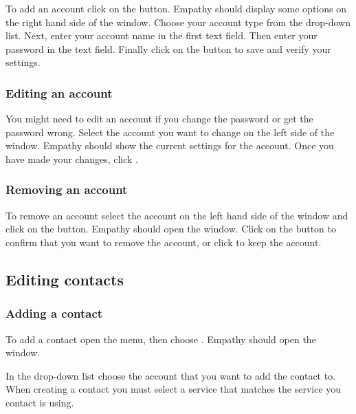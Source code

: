 To add an account click on the  button. Empathy should display 
some options on the right hand side of the window. Choose your account type 
from the  drop-down list. Next, enter your account name in 
the first text field. Then enter your password in the  
text field. Finally click on the  button to save and verify your 
settings.

\subsubsection{Editing an account}

You might need to edit an account if you change the password or get the password
wrong. Select the account you want to change on the left side of the 
 window. Empathy should show the current settings for the 
account. Once you have made your changes, click .

\subsubsection{Removing an account}

To remove an account select the account on the left hand side of the window and 
click on the  button. Empathy should open the 
 window. Click on the  button to 
confirm that you want to remove the account, or click  to keep
the account.

\subsection{Editing contacts}

\subsubsection{Adding a contact}

To add a contact open the  menu, then choose . 
Empathy should open the  window. 

In the  drop-down list choose the account that you want to 
add the contact to. When creating a contact you must select a service that matches the service you contact is using.

